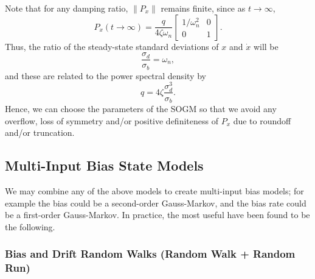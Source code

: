 Note that for any damping ratio, $\|P_x\|$ remains finite, since as $t\rightarrow\infty$,
\begin{equation}
	P_x(t\rightarrow\infty) = \frac{q}{4\zeta\omega_{n}}\left[
	\begin{array}{cc}
		1/\omega_{n}^{2} & 0  \\
		0 & 1
	\end{array}\right].
\end{equation}
Thus, the ratio of the steady-state standard deviations of $x$ and $\dot{x}$ will be
\begin{equation}
	\frac{\sigma_{d}}{\sigma_{b}} = \omega_{n},
\end{equation}
and these are related to the power spectral density by
\begin{equation}
	q = 4\zeta\frac{\sigma_{d}^{3}}{\sigma_{b}}.
\end{equation}
Hence, we can choose the parameters of the SOGM so that we avoid any overflow, loss of symmetry and/or positive definiteness of $P_x$ due to roundoff and/or truncation.

\subsection{Multi-Input Bias State Models}

We may combine any of the above models to create multi-input bias models; for example the bias could be a second-order Gauss-Markov, and the bias rate could be a first-order Gauss-Markov.  In practice, the most useful have been found to be the following.

\subsubsection{Bias and Drift Random Walks (Random Walk + Random Run)}

